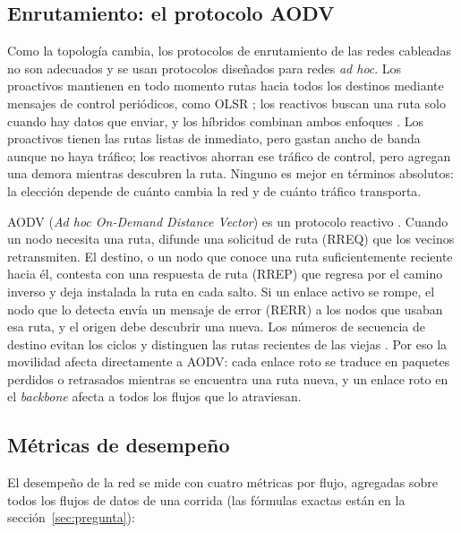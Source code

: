 \subsection{Enrutamiento: el protocolo AODV}
\label{sec:marco-aodv}

Como la topología cambia, los protocolos de enrutamiento de las redes cableadas no son
adecuados y se usan protocolos diseñados para redes \emph{ad hoc}. Los proactivos
mantienen en todo momento rutas hacia todos los destinos mediante mensajes de control
periódicos, como OLSR \cite{clausen2003olsr}; los reactivos buscan una ruta solo cuando
hay datos que enviar, y los híbridos combinan ambos enfoques
\cite{barbeau2007principles}. Los proactivos tienen las rutas listas de inmediato, pero
gastan ancho de banda aunque no haya tráfico; los reactivos ahorran ese tráfico de
control, pero agregan una demora mientras descubren la ruta. Ninguno es mejor en
términos absolutos: la elección depende de cuánto cambia la red y de cuánto tráfico
transporta.

AODV (\emph{Ad hoc On-Demand Distance Vector}) es un protocolo reactivo
\cite{rfc3561aodv}. Cuando un nodo necesita una ruta, difunde una solicitud de ruta
(RREQ) que los vecinos retransmiten. El destino, o un nodo que conoce una ruta
suficientemente reciente hacia él, contesta con una respuesta de ruta (RREP) que regresa
por el camino inverso y deja instalada la ruta en cada salto. Si un enlace activo se
rompe, el nodo que lo detecta envía un mensaje de error (RERR) a los nodos que usaban esa
ruta, y el origen debe descubrir una nueva. Los números de secuencia de destino evitan
los ciclos y distinguen las rutas recientes de las viejas \cite{rfc3561aodv}. Por eso la
movilidad afecta directamente a AODV: cada enlace roto se traduce en paquetes perdidos o
retrasados mientras se encuentra una ruta nueva, y un enlace roto en el \emph{backbone}
afecta a todos los flujos que lo atraviesan.

\subsection{Métricas de desempeño}
\label{sec:marco-metricas}

El desempeño de la red se mide con cuatro métricas por flujo, agregadas sobre todos los
flujos de datos de una corrida (las fórmulas exactas están en la
sección~\ref{sec:pregunta}):

